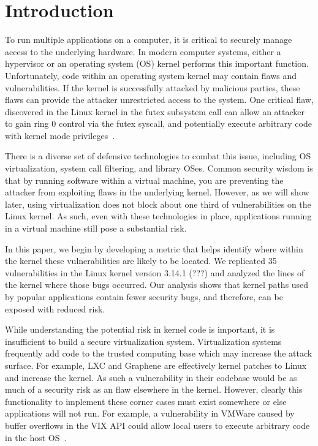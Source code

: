 \section{Introduction}
\label{sec.introduction}

To run multiple applications on a computer, it is critical to securely
manage access to the underlying hardware. In modern computer systems,
either a hypervisor or an operating system (OS) kernel performs this
important function. Unfortunately, code within an operating system kernel
may contain flaws and vulnerabilities. If the kernel is successfully
attacked by malicious parties, these flaws can provide the attacker
unrestricted access to the system. One critical flaw, discovered in the
Linux kernel in the futex subsystem call can allow an attacker to gain ring
0 control via the futex syscall, and potentially execute arbitrary code
with kernel mode privileges~\cite{CVE-2014-3153}. 

There is a diverse set of defensive technologies to combat this issue,
including OS virtualization, system call filtering, and library OSes.
Common security wisdom is that by running software within a virtual
machine, you are preventing the attacker from exploiting flaws in the
underlying kernel.  However, as we will show later, using virtualization
does not block about one third of vulnerabilities on the Linux kernel.  As
such, even with these technologies in place, applications running in a
virtual machine still pose a substantial risk.

In this paper, we begin by developing a metric that helps identify where
within the kernel these vulnerabilities are likely to be located. We
replicated 35 vulnerabilities in the Linux kernel version 3.14.1 (???)
and analyzed the lines of the kernel where those bugs occurred.  Our
analysis shows that kernel paths used by popular applications contain fewer
security bugs, and therefore, can be exposed with reduced risk. 

While understanding the potential risk in kernel code is important, it is
insufficient to build a secure virtualization system.  Virtualization
systems frequently add code to the trusted computing base which may
increase the attack surface.  For example, LXC and Graphene are effectively
kernel patches to Linux and increase the kernel.  As such a vulnerability
in their codebase would be as much of a security risk as an flaw elsewhere
in the kernel.  However, clearly this functionality to implement these
corner cases must exist somewhere or else applications will not run. For
example, a vulnerability in VMWare caused by buffer overflows in the VIX
API could allow local users to execute arbitrary code in the host
OS~\cite{CVE-2008-2100}.  

